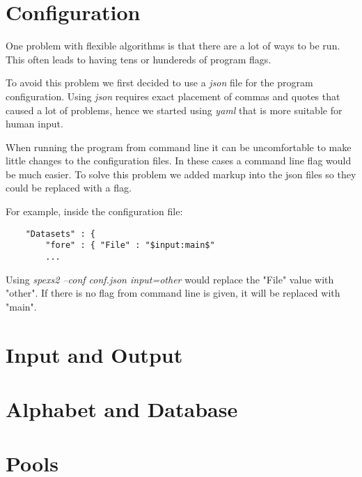 

\section{Configuration}

One problem with flexible algorithms is that there are a lot of ways to be run. This often leads to having tens or hundereds of program flags. 

To avoid this problem we first decided to use a \emph{json} file for the program configuration. Using \emph{json} requires exact placement of commas and quotes that caused a lot of problems, hence we started using \emph{yaml} that is more suitable for human input.


When running the program from command line it can be uncomfortable to make little changes to the configuration files. In these cases a command line flag would be much easier. To solve this problem we added markup into the json files so they could be replaced with a flag.

For example, inside the configuration file:

\begin{verbatim}
    "Datasets" : {
        "fore" : { "File" : "$input:main$"
        ...
\end{verbatim}

Using \emph{spexs2 --conf conf.json input=other} would replace the "File" value with "other". If there is no flag from command line is given, it will be replaced with "main".


\section{Input and Output}


\section{Alphabet and Database}


\section{Pools}

